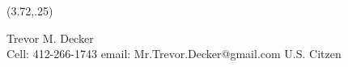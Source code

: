 \documentclass[]{article}
\begin{document}
%
%
%
\begin{textblock}{9}(3.72,.25)
\begin{center}
{\fontsize{40}{40}\selectfont Trevor M. Decker}\\
{\fontsize{9}{9}\selectfont
Cell: 412-266-1743  \hspace*{.5cm} email: Mr.Trevor.Decker@gmail.com  \hspace*{.5cm} U.S. Citzen\\
}
\end{center}
\end{textblock}


\addtolength{\topmargin}{1in}
\pagestyle{empty} %
\end{document}
